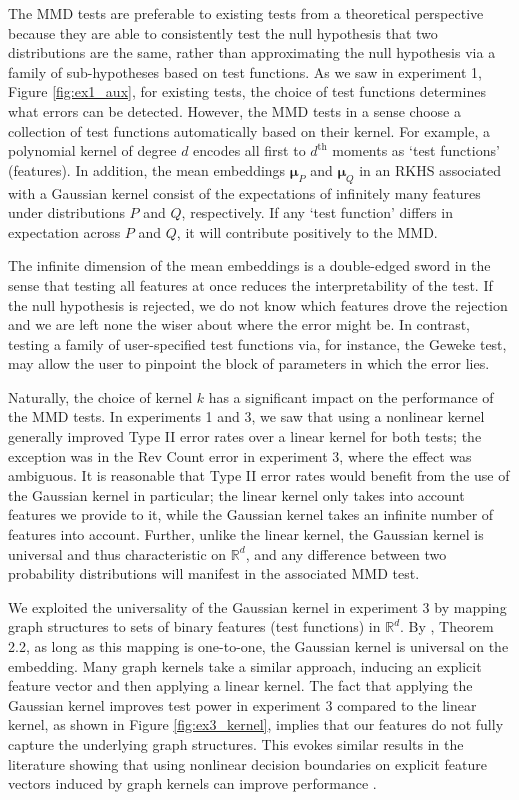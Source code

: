 \documentclass[a4paper,11pt]{article}
\begin{document}
The MMD tests are preferable to existing tests from a theoretical perspective because they are able to consistently test the null hypothesis that two distributions are the same, rather than approximating the null hypothesis via a family of sub-hypotheses based on test functions. As we saw in experiment 1, Figure \ref{fig:ex1_aux}, for existing tests, the choice of test functions determines what errors can be detected. However, the MMD tests in a sense choose a collection of test functions automatically based on their kernel. For example, a polynomial kernel of degree $d$ encodes all first to $d^{\text{th}}$ moments as `test functions' (features). In addition, the mean embeddings $\mathbf{\mu}_{P}$ and $\mathbf{\mu}_{Q}$ in an RKHS associated with a Gaussian kernel consist of the expectations of infinitely many features under distributions $P$ and $Q$, respectively. If any `test function' differs in expectation across $P$ and $Q$, it will contribute positively to the MMD.

The infinite dimension of the mean embeddings is a double-edged sword in the sense that testing all features at once reduces the interpretability of the test. If the null hypothesis is rejected, we do not know which features drove the rejection and we are left none the wiser about where the error might be. In contrast, testing a family of user-specified test functions via, for instance, the Geweke test, may allow the user to pinpoint the block of parameters in which the error lies. 

Naturally, the choice of kernel $k$ has a significant impact on the performance of the MMD tests. In experiments 1 and 3, we saw that using a nonlinear kernel generally improved Type II error rates over a linear kernel for both tests; the exception was in the Rev Count error in experiment 3, where the effect was ambiguous. It is reasonable that Type II error rates would benefit from the use of the Gaussian kernel in particular; the linear kernel only takes into account features we provide to it, while the Gaussian kernel takes an infinite number of features into account. Further, unlike the linear kernel, the Gaussian kernel is universal and thus characteristic on $\mathbb{R}^{d}$, and any difference between two probability distributions will manifest in the associated MMD test.

We exploited the universality of the Gaussian kernel in experiment 3 by mapping graph structures to sets of binary features (test functions) in $\mathbb{R}^{d}$. By \cite{christmann_universal_2010}, Theorem 2.2, as long as this mapping is one-to-one, the Gaussian kernel is universal on the embedding. Many graph kernels take a similar approach, inducing an explicit feature vector and then applying a linear kernel. The fact that applying the Gaussian kernel improves test power in experiment 3 compared to the linear kernel, as shown in Figure \ref{fig:ex3_kernel}, implies that our features do not fully capture the underlying graph structures. This evokes similar results in the literature showing that using nonlinear decision boundaries on explicit feature vectors induced by graph kernels can improve performance \cite{kriege_survey_2020}. 
\end{document}
